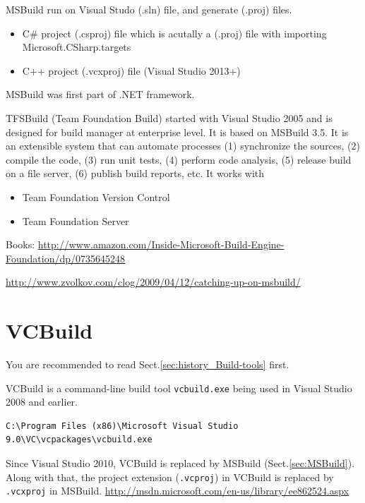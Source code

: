 MSBuild run on Visual Studo (.sln) file, and generate (.proj) files. 
\begin{itemize}
  \item C\# project (.csproj) file which is acutally a (.proj) file with
  importing Microsoft.CSharp.targets
  
  \item C++ project (.vcxproj) file (Visual Studio 2013+) 
\end{itemize}
MSBuild was
first part of .NET framework.

TFSBuild (Team Foundation Build) started with Visual Studio 2005 and is
designed for build manager at enterprise level. It is based on MSBuild 3.5. It
is an extensible system that can automate processes (1) synchronize the sources,
(2) compile the code, (3) run unit tests, (4) perform code analysis, (5) release
build on a file server, (6) publish build reports, etc. It works with
\begin{itemize}
  \item Team Foundation Version Control
  \item Team Foundation Server
\end{itemize}


Books:
\url{http://www.amazon.com/Inside-Microsoft-Build-Engine-Foundation/dp/0735645248}

\url{http://www.zvolkov.com/clog/2009/04/12/catching-up-on-msbuild/}

\section{VCBuild}
\label{sec:VCBuild}

You are recommended to read Sect.\ref{sec:history_Build-tools} first.

VCBuild is a command-line build tool \verb!vcbuild.exe! being used in Visual
Studio 2008 and earlier.
\begin{verbatim}
C:\Program Files (x86)\Microsoft Visual Studio 9.0\VC\vcpackages\vcbuild.exe
\end{verbatim}

Since Visual Studio 2010, VCBuild is replaced by MSBuild
(Sect.\ref{sec:MSBuild}). Along with that, the project extension
(\verb!.vcproj!) in VCBuild is replaced by \verb!.vcxproj! in MSBuild.
\url{http://msdn.microsoft.com/en-us/library/ee862524.aspx}


